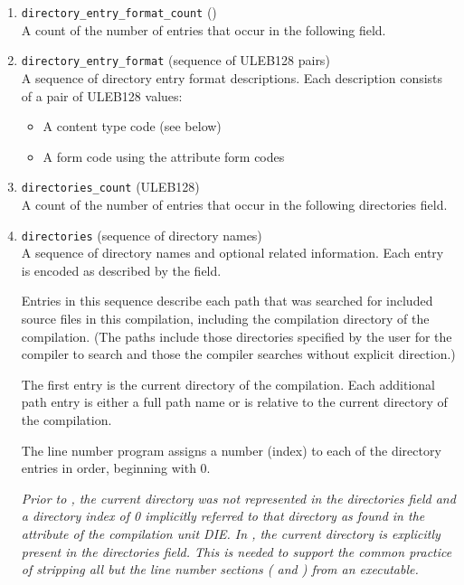 \begin{enumerate}[1. ]
\setcounter{enumi}{\value{saveenumi}}
\item \texttt{directory\_entry\_format\_count} (\HFTubyte) \\
    A count of the number of entries that occur in the
    following  field.
   
\item \texttt{directory\_entry\_format} (sequence of ULEB128 pairs) \\
    A sequence of directory entry format descriptions.
    Each description consists of a pair of ULEB128 values:
\begin{itemize}
\setlength{\itemsep}{0em}
\item A content type code (see below)
\item A form code using the attribute form codes
\end{itemize}

\item \texttt{directories\_count} (ULEB128) \\
A count of the number of entries that occur in the
following directories field.

\item \texttt{directories} (sequence of directory names) \\
A sequence of directory names and optional related
information. Each entry is encoded as described
by the  field.
   
Entries in this sequence describe each path that was
searched for included source files in this compilation,
including the compilation directory of the compilation.
(The paths include those directories specified by the
user for the compiler to search and those the compiler
searches without explicit direction.)
   
The first entry is the current directory of the compilation.
Each additional path entry is either a full path name or
is relative to the current directory of the compilation.
   
The line number program assigns a number (index) to each
of the directory entries in order, beginning with 0.
   
\textit{Prior to \DWARFVersionV, the current directory was not
represented in the directories field and a directory index
of 0 implicitly referred to that directory as found in the
\DWATcompdir{} attribute of the compilation unit DIE. In
\DWARFVersionV, the current directory is explicitly present
in the directories field. This is needed to support the
common practice of stripping all but the line number sections
(\dotdebugline{} and \dotdebuglinestr) from an executable.}


\end{enumerate}
